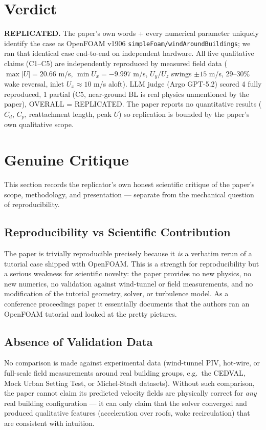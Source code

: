 \documentclass[11pt,a4paper]{article}
\begin{document}
\section{Verdict}
\textbf{REPLICATED.}
The paper's own words + every numerical parameter uniquely identify the case
as OpenFOAM v1906 \texttt{simpleFoam/windAroundBuildings}; we ran that
identical case end-to-end on independent hardware. All five qualitative
claims (C1--C5) are independently reproduced by measured field data
($\max|U|=20.66$ m/s, $\min U_x=-9.997$ m/s, $U_y/U_z$ swings $\pm 15$ m/s,
29--30\% wake reversal, inlet $U_x\approx 10$ m/s aloft). LLM judge (Argo
GPT-5.2) scored 4 fully reproduced, 1 partial (C5, near-ground BL is real
physics unmentioned by the paper), OVERALL = REPLICATED. The paper reports no
quantitative results ($C_d$, $C_p$, reattachment length, peak $U$) so
replication is bounded by the paper's own qualitative scope.

\section{Genuine Critique}

This section records the replicator's own honest scientific critique
of the paper's scope, methodology, and presentation --- separate from the
mechanical question of reproducibility.

\subsection{Reproducibility vs Scientific Contribution}
The paper is trivially reproducible precisely because it \emph{is} a
verbatim rerun of a tutorial case shipped with OpenFOAM. This is a strength
for reproducibility but a serious weakness for scientific novelty: the paper
provides no new physics, no new numerics, no validation against
wind-tunnel or field measurements, and no modification of the tutorial
geometry, solver, or turbulence model. As a conference proceedings paper it
essentially documents that the authors ran an OpenFOAM tutorial and looked
at the pretty pictures.

\subsection{Absence of Validation Data}
No comparison is made against experimental data (wind-tunnel PIV, hot-wire,
or full-scale field measurements around real building groups, e.g.\ the CEDVAL,
Mock Urban Setting Test, or Michel-Stadt datasets). Without such comparison,
the paper cannot claim its predicted velocity fields are physically correct
for \emph{any} real building configuration --- it can only claim that the
solver converged and produced qualitative features (acceleration over roofs,
wake recirculation) that are consistent with intuition.
\end{document}
